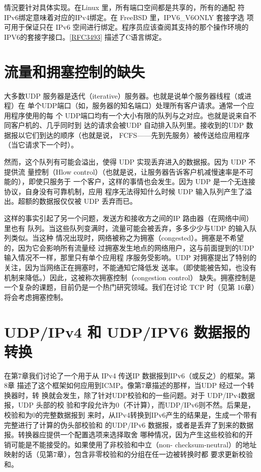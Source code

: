 \begin{tcolorbox}
  情況要针对具体实现。在Linux 里，所有端口空间都是共享的，所有的通配
  符 IPv6绑定意味着对应的IPv4绑定。在 FreeBSD 里，IPV6\_V6ONLY 套接字选
  项可用于保证只在 IPv6 空间进行绑定。程序员应该查阅其支持的那个操作环境的
  IPV6的套接字接口。\href{https://www.rfc-editor.org/rfc/rfc3493}{[RFC3493]} 描述了C语言绑定。
\end{tcolorbox}

\section{流量和拥塞控制的缺失}

大多数UDP 服务器是迭代（iterative）服务器。也就是说单个服务器线程（或进程）在
单个UDP端口（如，服务器的知名端口）处理所有客户请求。通常一个应用程序使用的每
个 UDP端口均有一个大小有限的队列与之对应。也就是说来自不同客户机的、几乎同时到
达的请求会被UDP 自动排入队列里。接收到的UDP 数据报以它们到达的顺序（也就是说，
FCFS——先到先服务）被传送给应用程序（当它请求下一个时）。

然而，这个队列有可能会溢出，使得 UDP 实现丢弃进入的数据报。因为 UDP 不提供流
量控制（Hlow control）（也就是说，让服务器告诉客户机减慢速率是不可能的），即使只服务于
一个客户，这样的事情也会发生。因为 UDP 是一个无连接协议，自身没有可靠机制，应用
程序无法得知什么时候 UDP 输入队列产生了溢出。超额的数据报仅仅被 UDP 丢弃而已。

这样的事实引起了另一个问题，发送方和接收方之间的IP 路由器（在网络中间）里也有
队列。当这些队列变满时，流量可能会被丢弃，多多少少与UDP 的输入队列类似。当这种
情况出现时，网络被称之为拥塞（congested）。拥塞是不希望的，因为它会影响所有流量经
过拥塞发生地点的网络用户，这与前面提到的UDP 输入情况不一样，那里只有单个应用程
序服务受影响。UDP 对拥塞提出了特别的关注，因为当网络正在拥塞时，不能通知它降低发
送率。（即使能被告知，也没有机制来降低。）因此，这被称次拥塞控制（congestion control）
缺失。拥塞控制是一个复杂的课题，目前仍是一个热门研究领域。我们在讨论 TCP 时（见第
16章）将会考虑拥塞控制。

\section{UDP/IPv4 和 UDP/IPV6 数据报的转换}
在第7章我们讨论了一个用于从 IPv4 传送IP 数据报到IPv6（或反之）的框架。第8章
描述了这个框架如何应用到ICMP。像第7章描述的那样，当UDP 经过一个转换器时，转
换就会发生，除了针对UDP校验和的一些问题。对于 UDP/IPv4数据报，UDP 头部的校
验和字段允许为0（不计算），而UDP/IPv6则不然。后果是，校验和为0的完整数据报到
来时，从IPv4转换到IPv6产生的结果是，生成一个带有完整进行了计算的伪头部校验和
的UDP/IPv6 数据报，或者是丢弃了到来的数据报。转换器应提供一个配置选项来选择取舍
哪种情况，因为产生这些校验和的开销可能是不能接受的。如果使用了非校验和中立（non-
checksum-neutral）的地址映射的话（见第7章），包含非零校验和的分组在任一边被转换时都
要求更新校验和。

